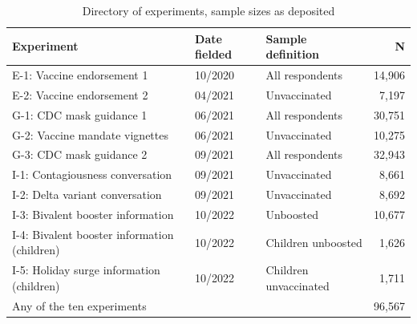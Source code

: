 \begin{table}

\caption{Directory of experiments, sample sizes as deposited}
\centering
\begin{tabular}[t]{lllr}
\toprule
Experiment & Date fielded & Sample definition & N\\
\midrule
E-1: Vaccine endorsement 1 & 10/2020 & All respondents & 14,906\\
E-2: Vaccine endorsement 2 & 04/2021 & Unvaccinated & 7,197\\
G-1: CDC mask guidance 1 & 06/2021 & All respondents & 30,751\\
G-2: Vaccine mandate vignettes & 06/2021 & Unvaccinated & 10,275\\
G-3: CDC mask guidance 2 & 09/2021 & All respondents & 32,943\\
\addlinespace
I-1: Contagiousness conversation & 09/2021 & Unvaccinated & 8,661\\
I-2: Delta variant conversation & 09/2021 & Unvaccinated & 8,692\\
I-3: Bivalent booster information & 10/2022 & Unboosted & 10,677\\
I-4: Bivalent booster information (children) & 10/2022 & Children unboosted & 1,626\\
I-5: Holiday surge information (children) & 10/2022 & Children unvaccinated & 1,711\\
\addlinespace
Any of the ten experiments &  &  & 96,567\\
\bottomrule
\end{tabular}
\end{table}
